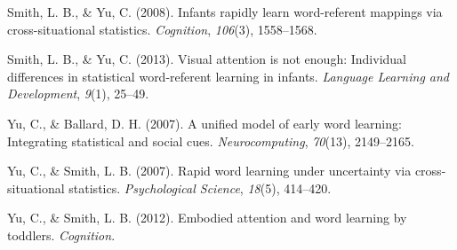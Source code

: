 \documentclass[man,floatsintext]{apa6}
\begin{document}
\hypertarget{ref-smith2008infants}{}
Smith, L. B., \& Yu, C. (2008). Infants rapidly learn word-referent
mappings via cross-situational statistics. \emph{Cognition},
\emph{106}(3), 1558--1568.

\hypertarget{ref-smith2013visual}{}
Smith, L. B., \& Yu, C. (2013). Visual attention is not enough:
Individual differences in statistical word-referent learning in infants.
\emph{Language Learning and Development}, \emph{9}(1), 25--49.

\hypertarget{ref-yu2007unified}{}
Yu, C., \& Ballard, D. H. (2007). A unified model of early word
learning: Integrating statistical and social cues.
\emph{Neurocomputing}, \emph{70}(13), 2149--2165.

\hypertarget{ref-yu2007rapid}{}
Yu, C., \& Smith, L. B. (2007). Rapid word learning under uncertainty
via cross-situational statistics. \emph{Psychological Science},
\emph{18}(5), 414--420.

\hypertarget{ref-yu2012embodied}{}
Yu, C., \& Smith, L. B. (2012). Embodied attention and word learning by
toddlers. \emph{Cognition}.

\endgroup
\end{document}
